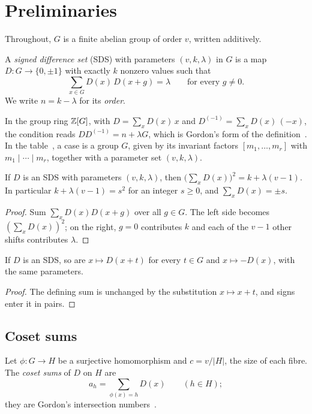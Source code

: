 \section{Preliminaries}\label{sec:prelim}

Throughout, $G$ is a finite abelian group of order $v$, written additively.

\begin{definition}\label{def:sds}
A \emph{signed difference set} (SDS) with parameters $(v,k,\lambda)$ in $G$ is a map
$D \colon G \to \{0,\pm1\}$ with exactly $k$ nonzero values such that
\[
  \sum_{x \in G} D(x)\, D(x+g) = \lambda \qquad \text{for every } g \neq 0.
\]
We write $n = k - \lambda$ for its \emph{order}.
\end{definition}

In the group ring $\mathbb{Z}[G]$, with $D = \sum_x D(x)\,x$ and $D^{(-1)} = \sum_x D(x)\,(-x)$, the
condition reads $D D^{(-1)} = n + \lambda G$, which is Gordon's form of the
definition~\cite{gordon}. In the table~\cite{gordon-db}, a case is a group $G$, given by its
invariant factors $[m_1, \dots, m_r]$ with $m_1 \mid \cdots \mid m_r$, together with a
parameter set $(v,k,\lambda)$.

\begin{lemma}\label{lem:square}
If $D$ is an SDS with parameters $(v,k,\lambda)$, then
$\bigl(\sum_x D(x)\bigr)^2 = k + \lambda(v-1)$. In particular $k + \lambda(v-1) = s^2$ for an
integer $s \ge 0$, and $\sum_x D(x) = \pm s$.
\end{lemma}

\begin{proof}
Sum $\sum_x D(x) D(x+g)$ over all $g \in G$. The left side becomes $(\sum_x D(x))^2$; on the
right, $g = 0$ contributes $k$ and each of the $v - 1$ other shifts contributes $\lambda$.
\end{proof}

\begin{lemma}\label{lem:translate}
If $D$ is an SDS, so are $x \mapsto D(x+t)$ for every $t \in G$ and $x \mapsto -D(x)$, with the
same parameters.
\end{lemma}

\begin{proof}
The defining sum is unchanged by the substitution $x \mapsto x + t$, and signs enter it in
pairs.
\end{proof}

\subsection{Coset sums}
Let $\phi \colon G \to H$ be a surjective homomorphism and $c = v/|H|$, the size of each fibre.
The \emph{coset sums} of $D$ on $H$ are
\[
  a_h = \sum_{\phi(x) = h} D(x) \qquad (h \in H);
\]
they are Gordon's intersection numbers~\cite[Lemma~5.2]{gordon}.

